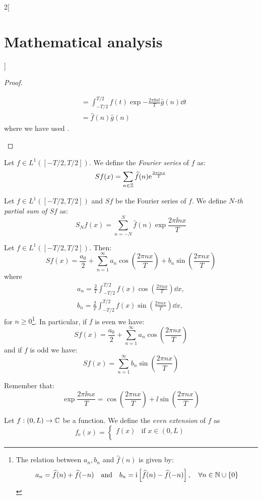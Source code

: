 \documentclass[../../../main_math.tex]{subfiles}
\begin{document}
\begin{multicols}{2}[\section{Mathematical analysis}]
\begin{proof}
\begin{enumerate}
\begin{align*}
                                 & =\int_{-T/2}^{T/2}f(t)\exp{-\frac{2\pi\ii nt}{T}}\widehat{g}(n)\dd{t}                               \\
                                 & =\widehat{f}(n)\widehat{g}(n)
            \end{align*}
            where we have used .
    \end{enumerate}
  \end{proof}
  \begin{definition}
    Let $f\in L^1([-T/2,T/2])$. We define the \emph{Fourier series} of $f$ as: $$\displaystyle Sf(x)=\sum_{n\in\ZZ }\widehat{f}(n)\exp{\frac{2\pi\ii nx}{T}}$$
  \end{definition}
  \begin{definition}
    Let $f\in L^1([-T/2,T/2])$ and $Sf$ be the Fourier series of $f$. We define \emph{$N$-th partial sum of $Sf$} as: $$S_Nf(x)=\sum_{n=-N}^N\widehat{f}(n)\exp{\frac{2\pi\ii nx}{T}}$$
  \end{definition}
  \begin{proposition}
    Let $f\in L^1([-T/2,T/2])$. Then: $$Sf(x)=\frac{a_0}{2}+\sum_{n=1}^\infty a_n\cos\left(\frac{2\pi nx}{T}\right)+b_n\sin\left(\frac{2\pi nx}{T}\right)$$ where \begin{gather*}
      a_n=\frac{2}{T}\int_{-T/2}^{T/2}f(x)\cos\left(\frac{2\pi nx}{T}\right)\dd{x},\\ b_n=\frac{2}{T}\int_{-T/2}^{T/2}f(x)\sin\left(\frac{2\pi nx}{T}\right)\dd{x},
    \end{gather*} for $n\geq 0$\footnote{The relation between $a_n,b_n$ and $\widehat{f}(n)$ is given by: $$a_n=\widehat{f}(n)+\widehat{f}(-n)\quad\text{and}\quad b_n=\ii\left[\widehat{f}(n)-\widehat{f}(-n)\right],\quad\forall n\in\NN \cup\{0\}$$}. In particular, if $f$ is even we have: $$Sf(x)=\frac{a_0}{2}+\sum_{n=1}^\infty a_n\cos\left(\frac{2\pi nx}{T}\right)$$ and if $f$ is odd we have: $$Sf(x)=\sum_{n=1}^\infty b_n\sin\left(\frac{2\pi nx}{T}\right)$$
  \end{proposition}
  \begin{sproof}
    Remember that: $$\exp{\frac{2\pi\ii nx}{T}}=\cos\left(\frac{2\pi nx}{T}\right)+\ii\sin\left(\frac{2\pi nx}{T}\right)$$
  \end{sproof}
  \begin{definition}
    Let $f:(0,L)\rightarrow\CC $ be a function. We define the \emph{even extension} of $f$ as $$f_\mathrm{e}(x)=
      \begin{cases}
        f(x)  & \text{if }x\in(0,L)  \\

\end{cases}$$
\end{definition}
\end{multicols}
\end{document}
